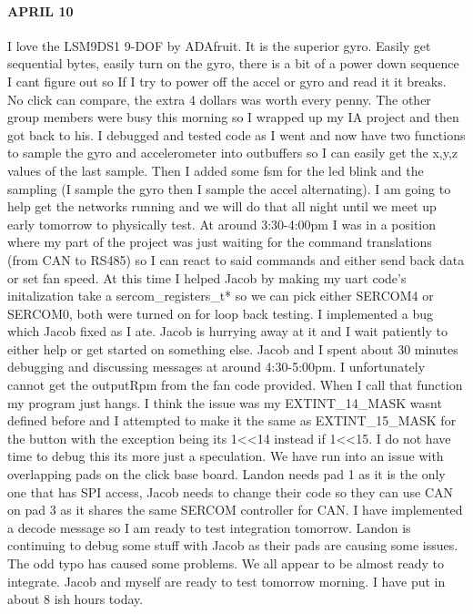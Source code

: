 \documentclass{article}
\begin{document}
\paragraph{APRIL 10} I love the LSM9DS1 9-DOF by ADAfruit. It is the superior gyro. Easily get sequential bytes, easily turn on the gyro, there is a bit of a power down sequence I cant figure out so If I try to power off the accel or gyro and read it it breaks. No click can compare, the extra 4 dollars was worth every penny. The other group members were busy this morning so I wrapped up my IA project and then got back to his. I debugged and tested code as I went and now have two functions to sample the gyro and accelerometer into outbuffers so I can easily get the x,y,z values of the last sample. Then I added some fsm for the led blink and the sampling (I sample the gyro then I sample the accel alternating). I am going to help get the networks running and we will do that all night until we meet up early tomorrow to physically test. At around 3:30-4:00pm I was in a position where my part of the project was just waiting for the command translations (from CAN to RS485) so I can react to said commands and either send back data or set fan speed. At this time I helped Jacob by making my uart code's initalization take a sercom\_registers\_t* so we can pick either SERCOM4 or SERCOM0, both were turned on for loop back testing. I implemented a bug which Jacob fixed as I ate. Jacob is hurrying away at it and I wait patiently to either help or get started on something else. Jacob and I spent about 30 minutes debugging and discussing messages at around 4:30-5:00pm. I unfortunately cannot get the outputRpm from the fan code provided. When I call that function my program just hangs. I think the issue was my EXTINT\_14\_MASK wasnt defined before and I attempted to make it the same as EXTINT\_15\_MASK for the button with the exception being its 1<<14 instead if 1<<15. I do not have time to debug this its more just a speculation. We have run into an issue with overlapping pads on the click base board. Landon needs pad 1 as it is the only one that has SPI access, Jacob needs to change their code so they can use CAN on pad 3 as it shares the same SERCOM controller for CAN. I have implemented a decode message  so I am ready to test integration tomorrow. Landon is continuing to debug some stuff with Jacob as their pads are causing some issues. The odd typo has caused some problems. We all appear to be almost ready to integrate. Jacob and myself are ready to test tomorrow morning. I have put in about 8 ish hours today. 
\end{document}
